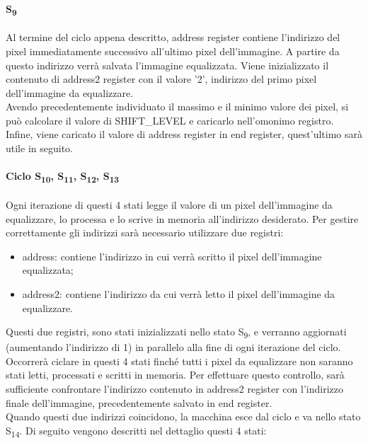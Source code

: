 \paragraph{S\textsubscript{9}}
Al termine del ciclo appena descritto, address register contiene l'indirizzo del pixel immediatamente successivo all'ultimo pixel dell'immagine. A partire da questo indirizzo verrà salvata l'immagine equalizzata.
Viene inizializzato il contenuto di address2 register con il valore '2', indirizzo del primo pixel dell'immagine da equalizzare.\\
Avendo precedentemente individuato il massimo e il minimo valore dei pixel, si può calcolare %
il valore di SHIFT\_LEVEL e caricarlo nell'omonimo registro.
Infine, viene caricato il valore di address register in end register, quest'ultimo sarà utile in seguito.
\paragraph{Ciclo S\textsubscript{10}, S\textsubscript{11}, S\textsubscript{12}, S\textsubscript{13}}
Ogni iterazione di questi 4 stati legge il valore di un pixel dell'immagine da equalizzare, lo processa e lo scrive in memoria all'indirizzo desiderato.
Per gestire correttamente gli indirizzi sarà necessario utilizzare due registri:
\begin{itemize}
    \item address: contiene l'indirizzo in cui verrà scritto il pixel dell'immagine equalizzata; %
    \item address2: contiene l'indirizzo da cui verrà letto il pixel dell'immagine da equalizzare. %
\end{itemize}
Questi due registri, sono stati inizializzati nello stato S\textsubscript{9}, e verranno aggiornati (aumentando l'indirizzo di 1) in parallelo alla fine di ogni iterazione del ciclo.
Occorrerà ciclare in questi 4 stati finché tutti i pixel da equalizzare non saranno stati letti, processati e scritti in memoria. Per effettuare questo controllo, sarà sufficiente confrontare l'indirizzo contenuto in address2 register con l'indirizzo finale dell'immagine, precedentemente salvato in end register.\\
Quando questi due indirizzi coincidono, la macchina esce dal ciclo e va nello stato S\textsubscript{14}. Di seguito vengono descritti nel dettaglio questi 4 stati:

